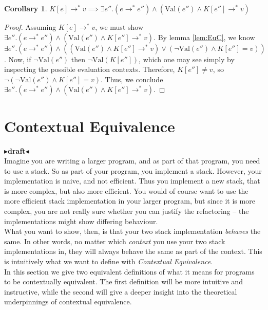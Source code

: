 \documentclass[twoside,11pt,openright]{report}
\newtheorem{corollary}{Corollary}[theorem]
\theoremstyle{definition}
\newcommand{\expr}{e}
\newcommand{\val}{v}
\newcommand{\elctx}{K}
\newcommand{\stepS}{\rightarrow^*}
\newcommand{\Val}[1]{\mathrm{Val}(#1)}
\newcommand{\todo}[1]{{\color[rgb]{.5,0,0}\textbf{$\blacktriangleright$#1$\blacktriangleleft$}}}
\begin{document}
\begin{corollary}\label{cor:EuC_val}
  $\elctx[\expr] \stepS \val \implies \exists \expr'' . (\expr \stepS \expr'') \land (\Val{\expr''} \land \elctx[\expr''] \stepS \val)$
\end{corollary}
\begin{proof}
  Assuming $\elctx[\expr] \stepS \val$, we must show $\exists \expr'' . (\expr \stepS \expr'') \land (\Val{\expr''} \land \elctx[\expr''] \stepS \val)$.
  By lemma \ref*{lem:EuC}, we know $\exists \expr'' . (\expr \stepS \expr'') \land ((\Val{\expr''} \land \elctx[\expr''] \stepS \val) \lor
  (\neg \Val{\expr''} \land \elctx[\expr''] = \val))$. Now, if $\neg \Val{\expr''}$ then $\neg \Val{\elctx[\expr'']}$, which one may see simply by inspecting the possible evaluation contexts. Therefore, $\elctx[\expr''] \neq \val$, so $\neg(\neg \Val{\expr''} \land \elctx[\expr''] = \val)$. Thus, we conclude $\exists \expr'' . (\expr \stepS \expr'') \land (\Val{\expr''} \land \elctx[\expr''] \stepS \val)$.
\end{proof}



\chapter{Contextual Equivalence}
\label{ch:CE}

\todo{draft}\\
Imagine you are writing a larger program, and as part of that program, you need to use a stack. So as part of your program, you implement a stack. However, your implementation is naive, and not efficient. Thus you implement a new stack, that is more complex, but also more efficient. You would of course want to use the more efficient stack implementation in your larger program, but since it is more complex, you are not really sure whether you can justify the refactoring – the implementations might show differing behaviour.\\
What you want to show, then, is that your two stack implementation \textit{behaves} the same. In other words, no matter which \textit{context} you use your two stack implementations in, they will always behave the same as part of the context. This is intuitively what we want to define with \textit{Contextual Equivalence}.\\
In this section we give two equivalent definitions of what it means for programs to be contextually equivalent. The first definition will be more intuitive and instructive, while the second will give a deeper insight into the theoretical underpinnings of contextual equivalence.
\end{document}
